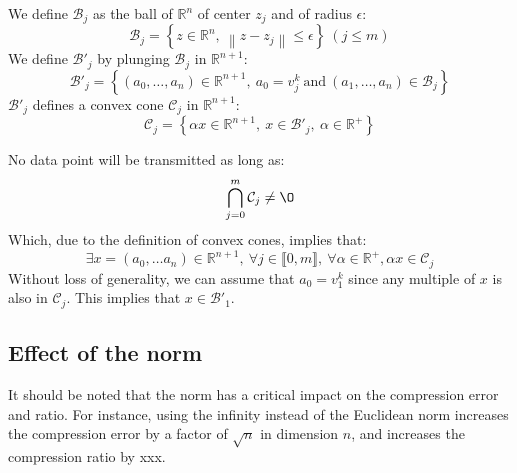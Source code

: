 \documentclass[10pt, conference, compsocconf]{IEEEtran}
\newcommand{\norm}[1]{\left\lVert#1\right\rVert}
\begin{document}
We define $\mathcal{B}_j$ as the ball of $\mathbb{R}^n$ of center $z_j$ and of radius 
$\epsilon$:
\begin{equation*}
\mathcal{B}_j = \left\{ z \in \mathbb{R}^n,\  \norm{z-z_j} \leq \epsilon \right\} \ (j \leq m)
\end{equation*}
We define $\mathcal{B}'_j$ by plunging $\mathcal{B}_j$ in $\mathbb{R}^{n+1}$:
\begin{equation*}
\mathcal{B'}_j = \left\{ (a_0, \ldots, a_{n}) \in \mathbb{R}^{n+1},\  a_0 = v_j^k \mathrm{\ and\ } (a_1, \ldots, a_{n}) \in \mathcal{B}_j \right\}
\end{equation*}
$\mathcal{B'}_j$ defines a convex cone $\mathcal{C}_j$ in $\mathbb{R}^{n+1}$:
\begin{equation*}
\mathcal{C}_j = \left\{ \alpha x  \in \mathbb{R}^{n+1},\ x \in \mathcal{B'}_j,\ \alpha \in \mathbb{R}^+ \right\}
\end{equation*}

No data point will be transmitted as long as:
\begin{equation*}
\bigcap_{j=0}^m{\mathcal{C}_j} \neq \O
\end{equation*}
Which, due to the definition of convex cones, implies that:
\begin{equation*}
\exists x=(a_0, \ldots a_n) \in \mathbb{R}^{n+1},\ \forall j \in \llbracket 0, m \rrbracket,\ \forall \alpha \in \mathbb{R^+}, \alpha x \in \mathcal{C}_j
\end{equation*}
Without loss of generality, we can assume that $a_0=v^k_1$ since any multiple
of $x$ is also in $\mathcal{C}_j$. 
This implies that $x \in \mathcal{B}'_1$.




\subsection{Effect of the norm}

It should be noted that the norm has a critical impact on the 
compression error and ratio. For instance, using the infinity instead 
of the Euclidean norm increases the compression error by a factor of 
$\sqrt{n}$ in dimension $n$, and increases the compression ratio by xxx. 





\end{document}
